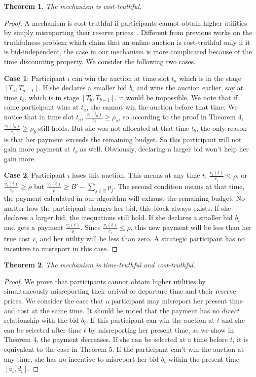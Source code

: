 \documentclass[conference,compsocconf,letterpaper,10pt]{IEEEtran}
\newtheorem{theorem}{Theorem}
\begin{document}
\begin{theorem}
The mechanism is cost-truthful.
\end{theorem}

\begin{proof}
A mechanism is cost-truthful if participants cannot obtain higher utilities by simply misreporting their reserve prices~\cite{zhao2014crowdsource}. Different from previous works on the truthfulness problem which claim that an online auction is cost-truthful only if it is bid-independent, the case in our mechanism is more complicated because of the time discounting property. We consider the following two cases.

\textbf{Case 1}: Participant $i$ can win the auction at time slot $t_a$ which is in the stage $[T_a,T_{a-1}]$. If she declares a smaller bid $b_i$ and wins the auction earlier, say at time $t_b$, which is in stage $[T_b,T_{b-1}]$, it would be impossible. We note that if some participant wins at $t_a$, she cannot win the auction before that time. We notice that in time slot $t_a$, $\frac{v_i(t_a)}{c_i} \ge \rho_a$, so according to the proof in Theorem $4$, $\frac{v_i(t_b)}{c_i} \ge \rho_b$ still holds. But she was not allocated at that time $t_b$, the only reason is that her payment exceeds the remaining budget. So this participant will not gain more payment at $t_b$ as well. Obviously, declaring a larger bid won't help her gain more.

\textbf{Case 2}: Participant $i$ loses this auction. This means at any time $t$, $\frac{v_i(t)}{c_i} \le \rho$, or $\frac{v_i(t)}{c_i} \ge \rho$ but $\frac{v_i(t)}{\rho} \ge B'-\sum_{j \in\mathbb{S}}p_j$. The second condition means at that time, the payment calculated in our algorithm will exhaust the remaining budget. No matter how the participant changes her bid, this  block always exists. If she declares a larger bid, the inequations still hold. If she declares a smaller bid $b_i$ and gets a payment $\frac{v_i(t)}{\rho}$. Since $\frac{v_i(t)}{c_i} \le \rho$, this new payment will be less than her true cost $c_i$ and her utility will be less than zero. A strategic participant has no incentive to misreport in this case.
\end{proof}

\begin{theorem}
The mechanism is time-truthful and cost-truthful.
\end{theorem}
\begin{proof}
We prove that participants cannot obtain higher utilities by simultaneously misreporting their arrival or departure time and their reserve prices. We consider the case that a participant may misreport her present time and cost at the same time. It should be noted that the payment has no $direct$ relationship with the bid $b_i$. If this participant can win the auction at $t$ and she can be selected after time $t$ by misreporting her present time, as we show in Theorem $4$, the payment decreases. If she can be selected at a time before $t$, it is equivalent to the case in Theorem $5$. If the participant can't win the auction at any time, she has no incentive to misreport her bid $b_i$ within the present time $[a_i, d_i]$.
\end{proof}
\end{document}
